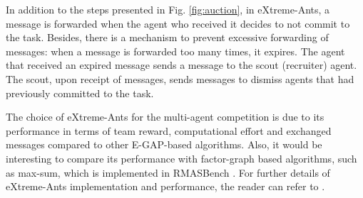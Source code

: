 In addition to the steps presented in Fig. \ref{fig:auction}, in eXtreme-Ants, a  message is forwarded when the agent who received it decides to not commit to the task. Besides, there is a mechanism to prevent excessive forwarding of  messages: when a  message is forwarded too many times, it expires. The agent that received an expired  message sends a  message to the scout (recruiter) agent. The scout, upon receipt of  messages, sends  messages to dismiss agents that had previously committed to the task. 

The choice of eXtreme-Ants for the multi-agent competition is due to its performance in terms of team reward, computational effort and exchanged messages compared to other E-GAP-based algorithms. Also, it would be interesting to compare its performance with factor-graph based algorithms, such as max-sum, which is implemented in RMASBench \citep{Kleiner+2013}. For further details of eXtreme-Ants implementation and performance, the reader can refer to \citep{Santos&Bazzan2009optmas}.


%



